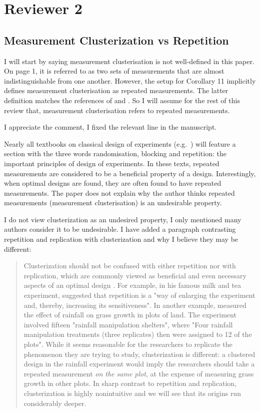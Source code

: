 \section{Reviewer 2}\label{ref2}
\subsection{Measurement Clusterization vs Repetition}
\RC I will start by saying measurement clusterisation is not
well-defined in this paper. On page 1, it is referred to as two sets
of measurements that are almost indistinguishable from one
another. However, the setup for Corollary 11 implicitly defines
measurement clusterisation as repeated measurements. The latter
definition matches the references of \cite{fedorov1996} and
\cite{nyberg2012}. So I will assume for the rest of this review that,
measurement clusterisation refers to repeated measurements.

\AR I appreciate the comment, I fixed the relevant line in the
manuscript.


\RC Nearly all textbooks on classical design of experiments
(e.g.~\cite[Section 1.2.4]{morris2011}) will feature a section with
the three words randomisation, blocking and repetition: the important
principles of design of experiments.  In these texts, repeated
measurements are considered to be a beneficial property of a
design. Interestingly, when optimal designs are found, they are often
found to have repeated measurements. The paper does not explain why
the author thinks repeated measurements (measurement clusterisation)
is an undesirable property.

\AR I do not view clusterization as an undesired property, I only
mentioned many authors consider it to be undesirable. I have added a
paragraph contrasting repetition and replication with clusterization
and why I believe they may be different:


\begin{quote}
  Clusterization should not be confused with either repetition nor
  with replication, which are commonly viewed as beneficial and even
  necessary aspects of an optimal design \cite{fisher1949design,
    morris2011, schafer2001replication}. For example,
  \cite{fisher1949design} in his famous milk and tea experiment,
  suggested that repetition is a "way of enlarging the experiment and,
  thereby, increasing its sensitiveness". In another example,
  \cite{fay2000rainfall} measured the effect of rainfall on grass
  growth in plots of land. The experiment involved fifteen "rainfall
  manipulation shelters", where "Four rainfall manipulation treatments
  (three replicates) then were assigned to 12 of the plots". While it
  seems reasonable for the researchers to replicate the phenomenon
  they are trying to study, clusterization is different: a clustered
  design in the rainfall experiment would imply the researchers should
  take a repeated measurement \emph{on the same plot}, at the expense
  of measuring grass growth in other plots. In sharp contrast to
  repetition and replication, clusterization is highly nonintuitive
  and we will see that its origins run considerably deeper.
\end{quote}



